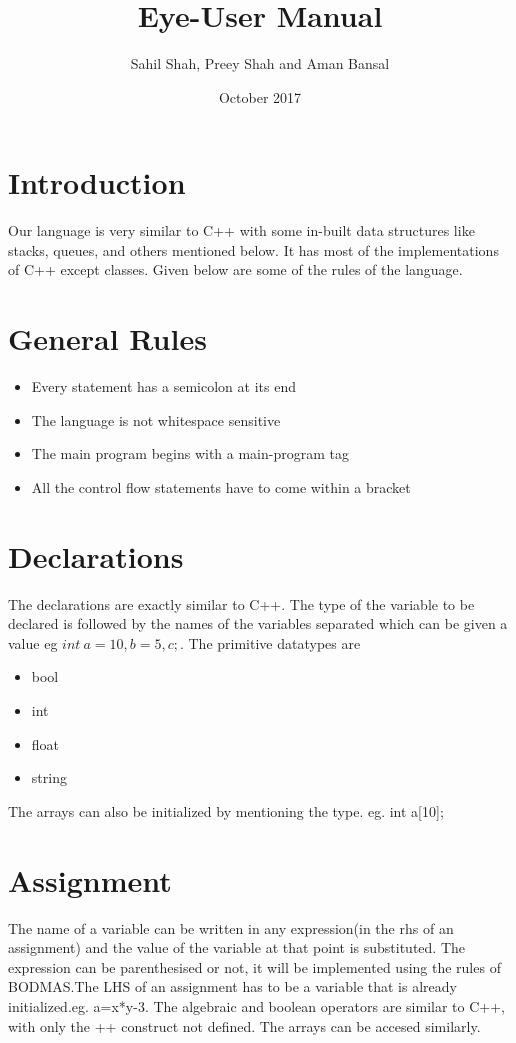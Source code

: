 \documentclass[12pt]{article}
\title{Eye-User Manual}
\author{Sahil Shah, Preey Shah and Aman Bansal }
\date{October 2017}
\begin{document}
\maketitle

\section{Introduction}
Our language is very similar to C++ with some in-built data structures like stacks, queues, and others mentioned below. It has most of the implementations of C++ except classes. Given below are some of the rules of the language.
\section{General Rules}
\begin{itemize}
\item Every statement has a semicolon at its end
\item The language is not whitespace sensitive
\item The main program begins with a main-program tag
\item All the control flow statements have to come within a {} bracket
\end{itemize}
\section{Declarations}
The declarations are exactly similar to C++. The type of the variable to be declared is followed by the names of the variables separated which can be given a value eg $int\ a=10,b=5,c;$. 
 The primitive datatypes are
\begin{itemize}
\item bool
\item int
\item float
\item string
\end{itemize}
The arrays can also be initialized by mentioning the type.
eg. int a[10];
\section{Assignment}
The name of a variable can be written in any expression(in the rhs of an assignment) and the value of the variable at that point is substituted.
The expression can be parenthesised or not, it will be implemented using the rules of BODMAS.The LHS of an assignment has to be a variable that is already initialized.eg. a=x*y-3.
The algebraic and boolean operators are similar to C++, with only the ++ construct not defined. The arrays can be accesed similarly.
\end{document}
